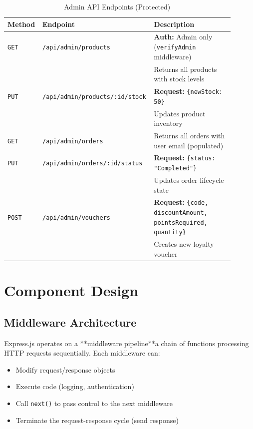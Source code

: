 \documentclass[12pt, a4paper]{report}
\begin{document}
\begin{table}[H]
\centering
\caption{Admin API Endpoints (Protected)}
\label{tab:api_admin}
\small
\begin{tabular}{@{}p{0.15\linewidth}p{0.40\linewidth}p{0.35\linewidth}@{}}
\toprule
\textbf{Method} & \textbf{Endpoint} & \textbf{Description} \\
\midrule
\texttt{GET} & \texttt{/api/admin/products} & 
\textbf{Auth:} Admin only (\texttt{verifyAdmin} middleware) \\
& & Returns all products with stock levels \\
\midrule
\texttt{PUT} & \texttt{/api/admin/products/:id/stock} & 
\textbf{Request:} \texttt{\{newStock: 50\}} \\
& & Updates product inventory \\
\midrule
\texttt{GET} & \texttt{/api/admin/orders} & 
Returns all orders with user email (populated) \\
\midrule
\texttt{PUT} & \texttt{/api/admin/orders/:id/status} & 
\textbf{Request:} \texttt{\{status: "Completed"\}} \\
& & Updates order lifecycle state \\
\midrule
\texttt{POST} & \texttt{/api/admin/vouchers} & 
\textbf{Request:} \texttt{\{code, discountAmount, pointsRequired, quantity\}} \\
& & Creates new loyalty voucher \\
\bottomrule
\end{tabular}
\end{table}

\section{Component Design}

\subsection{Middleware Architecture}

Express.js operates on a **middleware pipeline**a chain of functions processing HTTP requests sequentially. Each middleware can:
\begin{itemize}
    \item Modify request/response objects
    \item Execute code (logging, authentication)
    \item Call \texttt{next()} to pass control to the next middleware
    \item Terminate the request-response cycle (send response)
\end{itemize}
\end{document}
